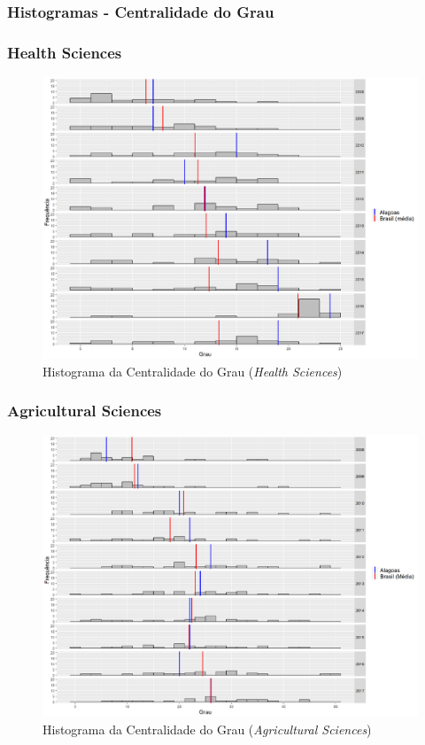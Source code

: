 \subsubsection{Histogramas - Centralidade do Grau}

\subsubsection{Health Sciences}

\begin{figure}[H]
	\centering
	\includegraphics[scale=0.6]{Imagens/degree-hist.pdf}
	\caption{Histograma da Centralidade do Grau (\textit{Health Sciences})}
	\label{degree-health-hist}
\end{figure}

\subsubsection{Agricultural Sciences}

\begin{figure}[H]
	\centering
	\includegraphics[scale=0.6]{Imagens/agricultural/degree-hist.pdf}
	\caption{Histograma da Centralidade do Grau (\textit{Agricultural Sciences})}
	\label{degree-agri-hist}
\end{figure}

